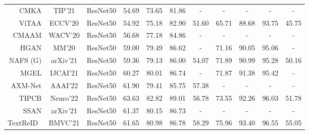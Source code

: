 \begin{table*}[t]
\begin{center}
\begin{tabular}{r|c|c|c|c|c|c|c|c|c|c}
CMKA \cite{chen2021cmka}          &TIP’21                   & ResNet50                                & 54.69           & 73.65           & 81.86            & -            & -               & -               & -                & -            \\ 
ViTAA \cite{wang2020vitaa}        &ECCV’20                   & ResNet50                               & 54.92           & 75.18           & 82.90            & 51.60        & 65.71           & 88.68           & 93.75            & 45.75        \\ 
CMAAM \cite{aggarwal2020cmaam}     &WACV’20                        & ResNet50                               & 56.68           & 77.18           & 84.86            & -            & -               & -               & -                & -            \\ 
HGAN \cite{zheng2020hierarchical}  &MM’20                         & ResNet50                                & 59.00           & 79.49           & 86.62            & -        & 71.16      & 90.05           & 95.06            & -        \\ 
NAFS (G) \cite{gao2021contextual}    &arXiv’21                           & ResNet50                            & 59.36           & 79.13          & 86.00            & 54.07            & 71.89               & 90.99               & 95.28                & 50.16            \\ 
MGEL \cite{wang2021mgel}       &IJCAI’21                       & ResNet50                          & 60.27           & 80.01          & 86.74            & -            & 71.87               & 91.38               & 95.42                & -            \\ 
AXM-Net \cite{farooq2021axm}     &AAAI’22                     & ResNet50                              & 61.90           & 79.41           & 85.75            & 57.38       & -               & -               & -                & -            \\ 
TIPCB \cite{chen2021tipcb}    &Neuro’22                      & ResNet50                            &63.63           & 82.82           & 89.01            & 56.78       & 73.55               & 92.26               & 96.03                & 51.78            \\ 
SSAN \cite{ssan}          &arXiv’21                 & ResNet50                                    & 61.37           & 80.15           & 86.73            & -       & -         & -          & -          & -      \\ 
TextReID~\cite{textreid}    &BMVC’21                          & ResNet50                                     & 61.65           & 80.98           & 86.78            & 58.29        & 75.96          & 93.40           & 96.55            & 55.05        \\ 

\end{tabular}
\end{center}
\end{table*}
